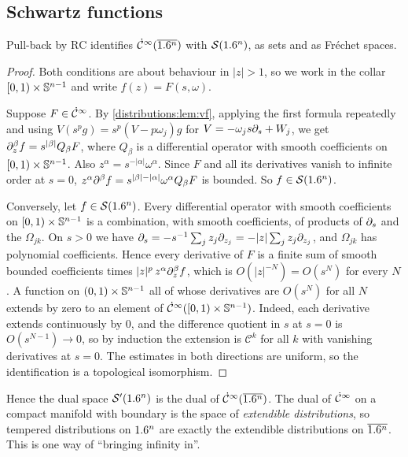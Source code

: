 \subsection{Schwartz functions}
\begin{proposition}\label{distributions:prop:S-dCI}
Pull-back by $\mathrm{RC}$ identifies $\dot{\mathcal{C}}^\infty(\overline{1.6^n})$ with $\mathcal{S}(1.6^n)$, as sets and
as Fr\'echet spaces.
\end{proposition}
\begin{proof}
Both conditions are about behaviour in $|z|>1$, so we work in the collar
$[0,1)\times\mathbb{S}^{n-1}$ and write $f(z)=F(s,\omega)$.

Suppose $F\in\dot{\mathcal{C}}^\infty$. By \cref{distributions:lem:vf}, applying the first formula
repeatedly and using $V(s^pg)=s^p(V-p\omega_j)g$ for $V=-\omega_js\partial_s+W_j$, we get
$\partial_z^\beta f=s^{|\beta|}Q_\beta F$, where $Q_\beta$ is a differential operator with
smooth coefficients on $[0,1)\times\mathbb{S}^{n-1}$. Also $z^\alpha=s^{-|\alpha|}\omega^\alpha$.
Since $F$ and all its derivatives vanish to infinite order at $s=0$,
$z^\alpha\partial^\beta f=s^{|\beta|-|\alpha|}\omega^\alpha Q_\beta F$ is bounded. So
$f\in\mathcal{S}(1.6^n)$.

Conversely, let $f\in\mathcal{S}(1.6^n)$. Every differential operator with smooth coefficients
on $[0,1)\times\mathbb{S}^{n-1}$ is a combination, with smooth coefficients, of products of
$\partial_s$ and the $\Omega_{jk}$. On $s>0$ we have $\partial_s=-s^{-1}\sum_jz_j\partial_{z_j}=-|z|\sum_jz_j\partial_{z_j}$,
and $\Omega_{jk}$ has polynomial coefficients. Hence every derivative of $F$ is a
finite sum of smooth bounded coefficients times $|z|^p\,z^\alpha\partial_z^\beta f$, which is
$O(|z|^{-N})=O(s^N)$ for every $N$. A function on $(0,1)\times\mathbb{S}^{n-1}$ all of
whose derivatives are $O(s^N)$ for all $N$ extends by zero to an element of
$\dot{\mathcal{C}}^\infty([0,1)\times\mathbb{S}^{n-1})$. Indeed, each derivative extends continuously by $0$,
and the difference quotient in $s$ at $s=0$ is $O(s^{N-1})\to0$, so by induction the
extension is $\mathcal{C}^k$ for all $k$ with vanishing derivatives at $s=0$. The
estimates in both directions are uniform, so the identification is a topological
isomorphism.
\end{proof}

Hence the dual space $\mathcal{S}'(1.6^n)$ is the dual of $\dot{\mathcal{C}}^\infty(\overline{1.6^n})$. The dual of $\dot{\mathcal{C}}^\infty$
on a compact manifold with boundary is the space of \emph{extendible distributions},
so tempered distributions on $1.6^n$ are exactly the extendible distributions on
$\overline{1.6^n}$. This is one way of ``bringing infinity in''.

